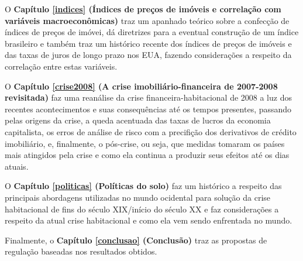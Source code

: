 \documentclass[
	12pt,				%
	oneside,			%
	a4paper,			%
	chapter=TITLE,		%
	section=TITLE,		%
	english,			%
	brazil				%
	]{abntex2}
\begin{document}
O \textbf{Capítulo \ref{indices} (Índices de preços de imóveis e correlação com variáveis macroeconômicas)}
traz um apanhado teórico sobre a confecção de índices de preços de imóvei, dá
diretrizes para a eventual construção de um índice brasileiro e também traz um
histórico recente dos índices de preços de imóveis e das taxas de juros de longo
prazo nos EUA, fazendo considerações a respeito da correlação entre estas
variáveis.

O \textbf{Capítulo \ref{crise2008} (A crise imobiliário-financeira de 2007-2008 revisitada)} faz
uma reanálise da crise financeira-habitacional de 2008 a luz dos recentes
acontecimentos e suas consequências até os tempos presentes, passando pelas
origens da crise, a queda acentuada das taxas de lucros da economia capitalista,
os erros de análise de risco com a precifição dos derivativos de crédito
imobiliário, e, finalmente, o pós-crise, ou seja, que medidas tomaram os países
mais atingidos pela crise e como ela continua a produzir seus efeitos até os
dias atuais.

O \textbf{Capítulo \ref{politicas} (Políticas do solo)} faz um histórico a
respeito das principais abordagens utilizadas no mundo ocidental para solução da
crise habitacional de fins do século XIX/início do século XX e faz considerações
a respeito da atual crise habitacional e como ela vem sendo enfrentada no mundo.

Finalmente, o \textbf{Capítulo \ref{conclusao} (Conclusão)} traz as propostas de regulação baseadas
nos resultados obtidos.
\end{document}
